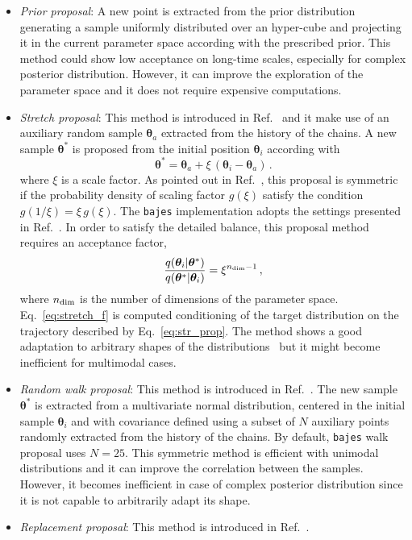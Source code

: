 \documentclass[prd,aps,twocolumn,a4paper,showkeys,nofootinbib,floatfix]{revtex4-1}
\newcommand{\be}{\begin{equation}}
\newcommand{\ee}{\end{equation}}
\def\params{\boldsymbol{\theta}}
\newcommand{\bajes}{{\tt bajes}}
\begin{document}
\begin{itemize}
\item {\it Prior proposal}: A new point is extracted from the prior distribution
generating a sample uniformly distributed over an hyper-cube 
and projecting it in the current parameter space according with 
the prescribed prior.
This method could show low acceptance 
on long-time scales,
especially for complex posterior distribution. However,
it can improve the exploration of the parameter space
and it does not require expensive computations.	
\item {\it Stretch proposal}: This method is introduced in Ref.~\cite{random_walk} and it make use of an auxiliary 
random sample $\params_a$ 
extracted from the history
of the chains. A new sample $\params^*$
is proposed
from the initial position $\params_i$
according with
\be
\label{eq:str_prop}
\params^* = \params_a + \xi\,(\params_i-\params_a)\,.
\ee
where $\xi$ is a scale factor. 
As pointed out in Ref.~\cite{stretch}, this proposal is symmetric
if the probability density of scaling factor $g(\xi)$ satisfy 
the condition $g(1/\xi)=\xi\,g(\xi)$.
The {\bajes} implementation adopts the settings presented in Ref.~\cite{Foreman_Mackey_2013}.
In order to satisfy the detailed balance, 
this proposal method requires an acceptance factor,
\be
\label{eq:stretch_f}
\frac{q(\params_i|\params^*)}{q(\params^*|\params_i)} =\xi ^{n_{\rm dim}-1}\,,
\ee							
where $n_{\rm dim}$ is the number of dimensions
of the parameter space.
Eq.~\eqref{eq:stretch_f} 
is computed conditioning of the target distribution on the
trajectory described by Eq.~\eqref{eq:str_prop}.
The method shows a good adaptation to 
arbitrary shapes of the distributions~\cite{random_walk} but 
it might become inefficient for multimodal cases.
\item {\it Random walk proposal}: This method is introduced in Ref.~\cite{random_walk}.
The new sample $\params^*$ is extracted from 
a multivariate normal distribution,
centered in the initial sample $\params_i$
and with covariance defined using a subset of $N$ auxiliary points randomly extracted from the history of the chains.
By default, {\bajes} walk proposal uses $N=25$.
This symmetric method is efficient with 
unimodal distributions and it can
improve the correlation between the samples. However, it becomes 
inefficient in case of complex posterior distribution
since it is not capable to arbitrarily adapt its shape.
\item {\it Replacement proposal}: This method is introduced in Ref.~\cite{random_walk}.

\end{itemize}
\end{document}
